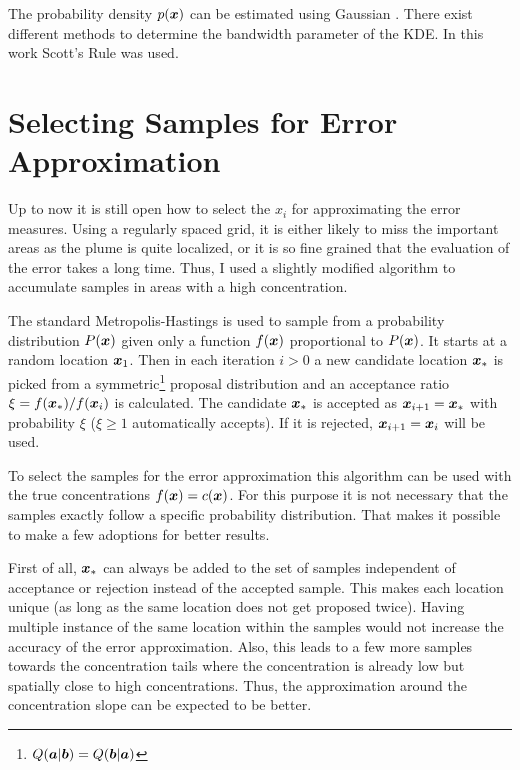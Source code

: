 The probability density $p(\bm{x})$ can be estimated using Gaussian 
. There exist different methods to 
determine the bandwidth parameter of the KDE\@. In this work Scott's Rule 
\parencite{Scott:2009tl} was used.

\section{Selecting Samples for Error Approximation}\label{sec:mh}
Up to now it is still open how to select the $x_i$ for approximating the error 
measures.  Using a regularly spaced grid, it is either likely to miss the 
important areas as the plume is quite localized, or it is so fine grained that 
the evaluation of the error takes a long time. Thus, I used a slightly modified 
 algorithm to accumulate samples in areas with 
a high concentration.

The standard Metropolis-Hastings \parencite{Chib:1994ud} is used to sample from 
a probability distribution $P(\bm{x})$ given only a function $f(\bm{x})$ 
proportional to $P(\bm{x})$. It starts at a random location $\bm{x}_1$.  Then in 
each iteration $i > 0$ a new candidate location $\bm{x}_*$ is picked from 
a symmetric\footnote{$Q(\bm{a} | \bm{b}) = Q(\bm{b} | \bm{a})$} proposal 
distribution and an acceptance ratio $\xi = f(\bm{x}_*) / f(\bm{x}_i)$ is 
calculated. The candidate $\bm{x}_*$ is accepted as $\bm{x}_{i + 1} = \bm{x}_*$ 
with probability $\xi$ ($\xi \geq 1$ automatically accepts). If it is rejected, 
$\bm{x}_{i + 1} = \bm{x}_i$ will be used.

To select the samples for the error approximation this algorithm can be used 
with the true concentrations $f(\bm{x}) = c(\bm{x})$. For this purpose it is not 
necessary that the samples exactly follow a specific probability distribution.  
That makes it possible to make a few adoptions for better results.

First of all, $\bm{x}_*$ can always be added to the set of samples independent of 
acceptance or rejection instead of the accepted sample.  This makes each 
location unique (as long as the same location does not get proposed twice).  
Having multiple instance of the same location within the samples would not 
increase the accuracy of the error approximation. Also, this leads to a few more 
samples towards the concentration tails where the concentration is already low 
but spatially close to high concentrations.  Thus, the approximation around the 
concentration slope can be expected to be better.

